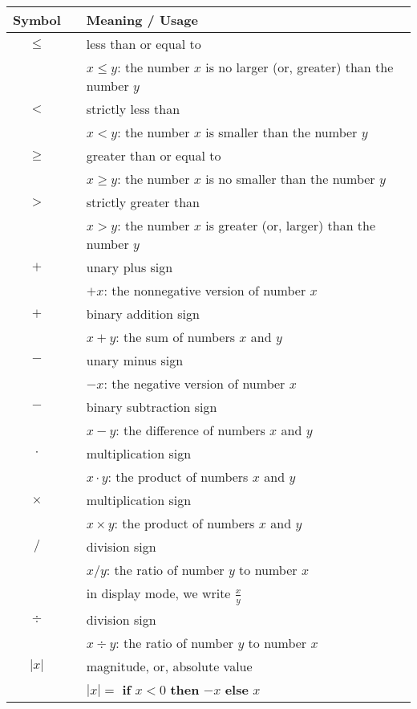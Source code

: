 \begin{tabular}{c|cl}
{\bf Symbol} & & {\bf Meaning} / {\bf Usage} \\ \hline
\hline
$\leq$
  & & less than or equal to  \\
  & & $x \leq y$: the number $x$ is no larger (or, greater) than the number $y$ \\ \hline
$<$
  & & strictly less than  \\
  & & $x < y$: the number $x$ is smaller than the number $y$ \\ \hline
$\geq$
  & & greater than or equal to  \\
  & & $x \geq y$: the number $x$ is no smaller than the number $y$ \\ \hline
$>$
  & & strictly greater than  \\
  & & $x > y$: the number $x$ is greater (or, larger) than the number $y$ \\ \hline
$+$
  & & unary plus sign \\
  & & $+x$: the nonnegative version of number $x$ \\ \hline
$+$
  & & binary addition sign \\
  & & $x+y$: the sum of numbers $x$ and $y$ \\ \hline
$-$
  & & unary minus sign \\
  & & $-x$: the negative version of number $x$ \\ \hline
$-$
  & & binary subtraction sign \\
  & & $x-y$: the difference of numbers $x$ and $y$ \\ \hline
$\cdot$
  & & multiplication sign \\
  & & $x \cdot y$: the product of numbers $x$ and $y$ \\
$\times$
  & & multiplication sign \\
  & & $x \times y$: the product of numbers $x$ and $y$ \\ \hline
$/$
  & & division sign \\
  & & $x / y$: the ratio of number $y$ to number $x$ \\
  & & in display mode, we write $\displaystyle \frac{x}{y}$ \\
$\div$
  & & division sign \\
  & & $x \div y$: the ratio of number $y$ to number $x$ \\ \hline
$|x|$
  & & magnitude, or, absolute value \\
  & & $|x| =$ {\bf if} $x<0$ {\bf then} $-x$ {\bf else} $x$ \\ \hline

\end{tabular}
